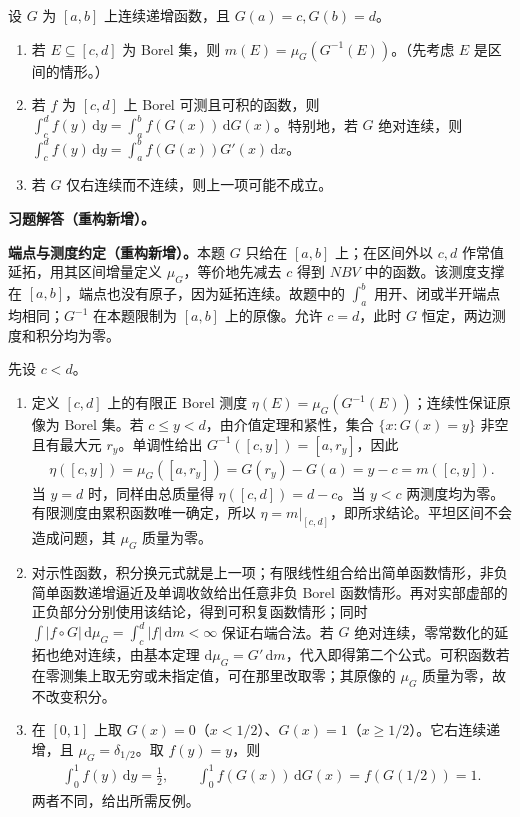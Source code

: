 \documentclass[../../main.tex]{subfiles}%
\begin{document}
\begin{exercise}\label{exercise:ch03-stieltjes-change-variables}
设 $G$ 为 $[a,b]$ 上连续递增函数，且 $G(a)=c,G(b)=d$。
\begin{enumerate}
\item\label{item:ch03-stieltjes-pushforward} 若 $E\subseteq[c,d]$ 为 Borel 集，则 $m(E)=\mu_G(G^{-1}(E))$。（先考虑 $E$ 是区间的情形。）
\item\label{item:ch03-stieltjes-substitution} 若 $f$ 为 $[c,d]$ 上 Borel 可测且可积的函数，则 $\int_c^df(y)\,\mathrm dy=\int_a^bf(G(x))\,\mathrm dG(x)$。特别地，若 $G$ 绝对连续，则 $\int_c^df(y)\,\mathrm dy=\int_a^bf(G(x))G'(x)\,\mathrm dx$。
\item\label{item:ch03-stieltjes-discontinuous-failure} 若 $G$ 仅右连续而不连续，则上一项可能不成立。
\end{enumerate}
\end{exercise}
\begin{solution}
\label{solution:ch03-stieltjes-change-variables}
\textbf{习题解答（重构新增）。}\begin{remark}
\textbf{端点与测度约定（重构新增）。}本题 $G$ 只给在 $[a,b]$ 上；在区间外以 $c,d$ 作常值延拓，用其区间增量定义 $\mu_G$，等价地先减去 $c$ 得到 $NBV$ 中的函数。该测度支撑在 $[a,b]$，端点也没有原子，因为延拓连续。故题中的 $\int_a^b$ 用开、闭或半开端点均相同；$G^{-1}$ 在本题限制为 $[a,b]$ 上的原像。允许 $c=d$，此时 $G$ 恒定，两边测度和积分均为零。
\end{remark}
先设 $c<d$。
\begin{enumerate}
\item 定义 $[c,d]$ 上的有限正 Borel 测度 $\eta(E)=\mu_G(G^{-1}(E))$；连续性保证原像为 Borel 集。若 $c\le y<d$，由介值定理和紧性，集合 $\{x:G(x)=y\}$ 非空且有最大元 $r_y$。单调性给出 $G^{-1}([c,y])=[a,r_y]$，因此
\begin{align*}
\eta([c,y])=\mu_G([a,r_y])=G(r_y)-G(a)=y-c=m([c,y]).
\end{align*}
当 $y=d$ 时，同样由总质量得 $\eta([c,d])=d-c$。当 $y<c$ 两测度均为零。有限测度由累积函数唯一确定，所以 $\eta=m|_{[c,d]}$，即所求结论。平坦区间不会造成问题，其 $\mu_G$ 质量为零。
\item 对示性函数，积分换元式就是上一项；有限线性组合给出简单函数情形，非负简单函数递增逼近及单调收敛给出任意非负 Borel 函数情形。再对实部虚部的正负部分分别使用该结论，得到可积复函数情形；同时 $\int|f\circ G|\,\mathrm d\mu_G=\int_c^d|f|\,\mathrm dm<\infty$ 保证右端合法。若 $G$ 绝对连续，零常数化的延拓也绝对连续，由基本定理 $\mathrm d\mu_G=G'\,\mathrm dm$，代入即得第二个公式。可积函数若在零测集上取无穷或未指定值，可在那里改取零；其原像的 $\mu_G$ 质量为零，故不改变积分。
\item 在 $[0,1]$ 上取 $G(x)=0$（$x<1/2$）、$G(x)=1$（$x\ge1/2$）。它右连续递增，且 $\mu_G=\delta_{1/2}$。取 $f(y)=y$，则
\begin{align*}
\int_0^1f(y)\,\mathrm dy=\tfrac12,
\qquad \int_0^1f(G(x))\,\mathrm dG(x)=f(G(1/2))=1.
\end{align*}
两者不同，给出所需反例。
\end{enumerate}
\end{solution}
\end{document}
